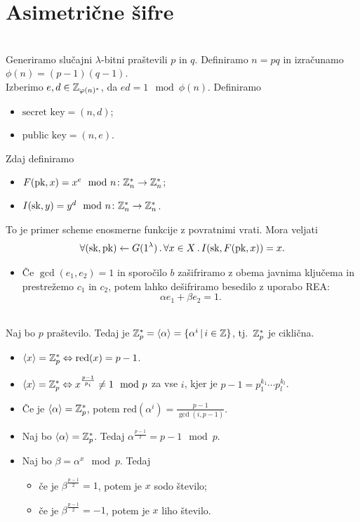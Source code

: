 \section{Asimetrične šifre}
\\
Generiramo slučajni \(\lambda\)-bitni praštevili \(p\) in \(q\). Definiramo \(n = pq\) in izračunamo \(\phi(n) = (p - 1)(q-1)\).\\
Izberimo \(e, d \in \mathbb{Z}_{\varphi(n)^*}\), da \(ed = 1 \mod \phi(n)\). Definiramo 
\begin{itemize}
    \item \(\text{secret key} = (n, d)\);
    \item \(\text{public key} = (n, e)\).
\end{itemize}
Zdaj definiramo 
\begin{itemize}
    \item \(F(\text{pk}, x) = x^e \mod n \colon \mathbb{Z}_n^* \to \mathbb{Z}_n^*\);
    \item \(I(\text{sk}, y) = y^d \mod n \colon \mathbb{Z}_n^* \to \mathbb{Z}_n^*\).
\end{itemize}
To je primer scheme enosmerne funkcije z povratnimi vrati. Mora veljati
\[
    \forall (\text{sk}, \text{pk}) \leftarrow G(1^\lambda) \,.\, \forall x \in X \,.\, I(\text{sk}, F(\text{pk}, x)) = x.
\]
\begin{itemize}
    \item Če \(\gcd(e_1, e_2) = 1\) in sporočilo \(b\) zašifriramo z obema javnima ključema in prestrežemo \(c_1\) in \(c_2\), potem lahko dešifriramo besedilo z uporabo REA: \[\alpha e_1 + \beta e_2 = 1.\]
\end{itemize}
 \\
Naj bo \(p\) praštevilo. Tedaj je \(\mathbb{Z}_p^* = \langle \alpha \rangle = \{\alpha^i \,|\, i \in \mathbb{Z}\}\), tj.\ \(\mathbb{Z}_p^*\) je ciklična.
\begin{itemize}
    \item \(\langle x \rangle = \mathbb{Z}_p^* \Leftrightarrow \text{red}(x) = p - 1\).
    \item \(\langle x \rangle = \mathbb{Z}_p^* \Leftrightarrow x^{\frac{p-1}{p_i}} \neq 1 \mod p\) za vse \(i\), kjer je \(p - 1 = p_1^{k_1} \cdots p_l^{k_l}\).
    \item Če je \(\langle \alpha \rangle = \mathbb{Z}_p^* \), potem \(\text{red}(\alpha^i) = \frac{p - 1}{\gcd(i, p - 1)}\).
    \item Naj bo \(\langle \alpha \rangle = \mathbb{Z}_p^*\). Tedaj \(\alpha^{\frac{p-1}{2}} = p - 1 \mod p\).
    \item Naj bo \(\beta = \alpha^x \mod p\). Tedaj
    \begin{itemize}
        \item če je \(\beta^{\frac{p-1}{2}} = 1\), potem je \(x\) sodo število;
        \item če je \(\beta^{\frac{p-1}{2}} = -1\), potem je \(x\) liho število.
    \end{itemize}
\end{itemize}
